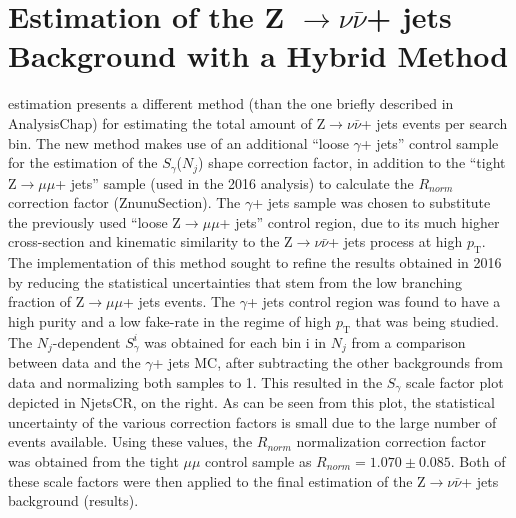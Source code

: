 \section{Estimation of the Z $\rightarrow \nu\bar{\nu}$+ jets Background with a Hybrid Method}

{estimation} presents a different method (than the one briefly described in {AnalysisChap}) for estimating the total amount of Z$\rightarrow \nu\bar{\nu}$+ jets events per search bin. The new method makes use of an additional ``loose $\gamma$+ jets'' control sample for the estimation of the $S_\gamma$($N_j$) shape correction factor, in addition to the ``tight Z$\rightarrow\mu\mu$+ jets'' sample (used in the 2016 analysis) to calculate the $R_{norm}$ correction factor ({ZnunuSection}). The $\gamma$+ jets sample was chosen to substitute the previously used ``loose Z$\rightarrow\mu\mu$+ jets'' control region, due to its much higher cross-section and kinematic similarity to the Z$\rightarrow \nu\bar{\nu}$+ jets process at high $p_\text{T}$. The implementation of this method sought to refine the results obtained in 2016 by reducing the statistical uncertainties that stem from the low branching fraction of Z$\rightarrow\mu\mu$+ jets events. The $\gamma$+ jets control region was found to have a high purity and a low fake-rate in the regime of high $p_\text{T}$ that was being studied. The $N_j$-dependent $S_\gamma^{i}$ was obtained for each bin i in $N_j$ from a comparison between data and the $\gamma$+ jets MC, after subtracting the other backgrounds from data and normalizing both samples to 1. This resulted in the $S_\gamma$ scale factor plot depicted in {NjetsCR}, on the right. As can be seen from this plot, the statistical uncertainty of the various correction factors is small due to the large number of events available. Using these values, the $R_{norm}$ normalization correction factor was obtained from the tight $\mu\mu$ control sample as $R_{norm} = 1.070 \pm 0.085$. Both of these scale factors were then applied to the final estimation of the Z$\rightarrow \nu\bar{\nu}$+ jets background ({results}). 
